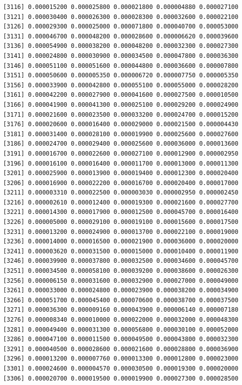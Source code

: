 \documentclass[]{article}
\begin{document}
\begin{verbatim}
 [3116] 0.000015200 0.000025800 0.000021800 0.000004880 0.000027100
 [3121] 0.000030400 0.000026300 0.000028300 0.000032600 0.000022100
 [3126] 0.000029300 0.000025000 0.000071800 0.000040700 0.000053000
 [3131] 0.000046700 0.000048200 0.000028600 0.000006620 0.000039600
 [3136] 0.000054900 0.000038200 0.000048200 0.000032300 0.000027300
 [3141] 0.000024800 0.000030900 0.000034500 0.000047800 0.000036300
 [3146] 0.000051100 0.000051600 0.000044800 0.000036600 0.000007800
 [3151] 0.000050600 0.000005350 0.000006720 0.000007750 0.000005350
 [3156] 0.000033900 0.000042800 0.000055100 0.000055000 0.000028200
 [3161] 0.000042200 0.000027900 0.000041600 0.000027500 0.000010500
 [3166] 0.000041900 0.000041300 0.000025100 0.000029200 0.000024900
 [3171] 0.000021600 0.000023500 0.000033200 0.000024700 0.000015200
 [3176] 0.000020600 0.000016400 0.000029000 0.000021500 0.000004430
 [3181] 0.000031400 0.000028100 0.000019900 0.000025600 0.000027600
 [3186] 0.000024700 0.000029400 0.000025600 0.000036000 0.000013600
 [3191] 0.000016700 0.000022600 0.000027100 0.000012900 0.000002950
 [3196] 0.000016100 0.000016400 0.000011700 0.000013000 0.000011300
 [3201] 0.000025900 0.000013900 0.000019400 0.000012300 0.000020400
 [3206] 0.000016900 0.000022200 0.000016700 0.000020400 0.000017000
 [3211] 0.000003310 0.000022500 0.000003030 0.000002950 0.000002450
 [3216] 0.000002610 0.000012400 0.000019300 0.000021600 0.000027700
 [3221] 0.000014300 0.000017900 0.000012500 0.000045700 0.000016400
 [3226] 0.000005000 0.000029100 0.000019100 0.000015600 0.000017500
 [3231] 0.000013200 0.000024900 0.000013700 0.000022100 0.000019000
 [3236] 0.000014000 0.000016500 0.000021900 0.000036000 0.000020000
 [3241] 0.000003620 0.000031500 0.000015000 0.000010400 0.000011900
 [3246] 0.000039900 0.000037800 0.000032500 0.000034600 0.000045700
 [3251] 0.000034500 0.000058100 0.000039200 0.000038600 0.000026300
 [3256] 0.000006150 0.000031600 0.000032900 0.000027000 0.000049000
 [3261] 0.000033000 0.000024800 0.000023900 0.000038200 0.000034900
 [3266] 0.000051700 0.000045400 0.000070600 0.000038700 0.000037500
 [3271] 0.000036300 0.000009160 0.000043900 0.000006140 0.000007180
 [3276] 0.000008340 0.000010000 0.000022000 0.000032000 0.000048300
 [3281] 0.000049400 0.000031300 0.000056800 0.000030100 0.000052000
 [3286] 0.000047100 0.000011500 0.000049500 0.000043800 0.000032300
 [3291] 0.000040500 0.000028600 0.000021600 0.000028800 0.000036900
 [3296] 0.000013200 0.000007760 0.000013300 0.000012800 0.000023000
 [3301] 0.000024600 0.000004570 0.000030500 0.000019300 0.000020000
 [3306] 0.000020700 0.000019500 0.000019900 0.000027300 0.000028500

\end{verbatim}
\end{document}
